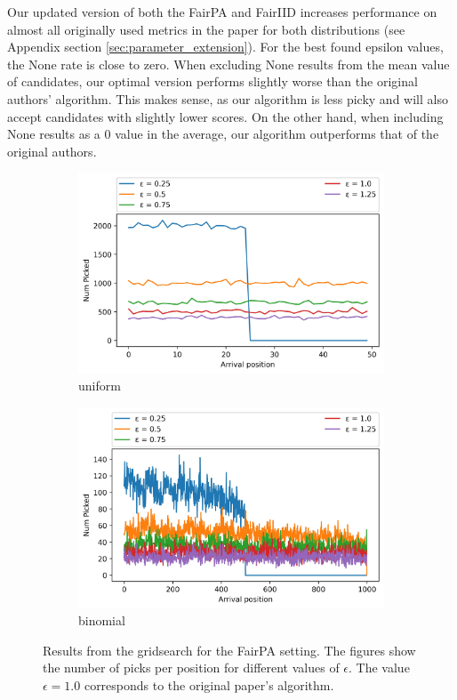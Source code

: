 Our updated version of both the FairPA and FairIID increases performance on almost all originally used metrics in the paper for both distributions (see Appendix section \ref{sec:parameter_extension}). For the best found epsilon values, the None rate is close to zero. When excluding None results from the mean value of candidates, our optimal version performs slightly worse than the original authors' algorithm. This makes sense, as our algorithm is less picky and will also accept candidates with slightly lower scores. On the other hand, when including None results as a $0$ value in the average, our algorithm outperforms that of the original authors.

\begin{figure}[h!]
  \begin{subfigure}[t]{.5\textwidth}
    \centering
    \includegraphics[width=\linewidth]{Images/extension/FairGeneralProphet_uniform.jpeg}
    \caption{uniform}
    \label{fig:extension_fairPA_uniform}
  \end{subfigure}
  \hfill
  \begin{subfigure}[t]{.5\textwidth}
    \centering
    \includegraphics[width=\linewidth]{Images/extension/FairGeneralProphet_binomial.jpeg}
    \caption{binomial}
    \label{fig:extension_fairPA_binomial}
  \end{subfigure}
  \caption{
    Results from the gridsearch for the FairPA setting. The figures show the number of picks per position for different values of $\epsilon$. The value $\epsilon = 1.0$ corresponds to the original paper's algorithm.
    }
    \label{fig:extension_fairPA}
\end{figure}

